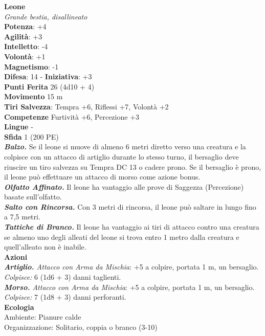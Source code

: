 \begin{multicols}{2}
\medskip\textbf{Leone}\\
\emph{Grande bestia, disallineato}\\
\textbf{Potenza}: +4\\
\textbf{Agilità}: +3\\
\textbf{Intelletto}: -4\\
\textbf{Volontà}: +1\\
\textbf{Magnetismo}: -1\\
\textbf{Difesa}: 14 - \textbf{Iniziativa}: +3\\
\textbf{Punti Ferita} 26 (4d10 + 4)\\
\textbf{Movimento} 15 m\\
\textbf{Tiri Salvezza}: Tempra +6, Riflessi +7, Volontà +2 \\
\textbf{Competenze} Furtività +6, Percezione +3\\
\textbf{Lingue} -\\
\textbf{Sfida} 1 (200 PE)\smallskip\\
\emph{\textbf{Balzo.}} Se il leone si muove di almeno 6 metri diretto verso una creatura e la colpisce con un attacco di artiglio durante lo stesso turno, il bersaglio deve riuscire un tiro salvezza su Tempra DC 13 o cadere prono. Se il bersaglio è prono, il leone può effettuare un attacco di morso come azione bonus.\\
\emph{\textbf{Olfatto Affinato.}} Il leone ha vantaggio alle prove di Saggezza (Percezione) basate sull'olfatto.\\
\emph{\textbf{Salto con Rincorsa.}} Con 3 metri di rincorsa, il leone può saltare in lungo fino a 7,5 metri.\\
\emph{\textbf{Tattiche di Branco.}} Il leone ha vantaggio ai tiri di attacco contro una creatura se almeno uno degli alleati del leone si trova entro 1 metro dalla creatura e quell'alleato non è inabile.\\
\smallskip\textbf{Azioni}\\
\emph{\textbf{Artiglio.} Attacco con Arma da Mischia}: +5 a colpire, portata 1 m, un bersaglio.\\
\emph{Colpisce:} 6 (1d6 + 3) danni taglienti.\\
\emph{\textbf{Morso.} Attacco con Arma da Mischia}: +5 a colpire, portata 1 m, un bersaglio.\\
\emph{Colpisce:} 7 (1d8 + 3) danni perforanti.\\
\textbf{Ecologia}\\
Ambiente: Pianure calde\\
Organizzazione: Solitario, coppia o branco (3-10)\\

\end{multicols}
